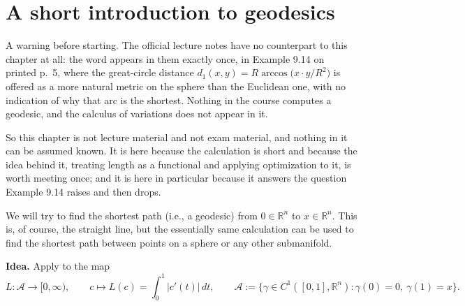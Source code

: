 

\section{A short introduction to geodesics}
\label{sec:geodesics}

\begin{ainote}
\label{ainote:geodesics_beyond_the_course}
A warning before starting. The official lecture notes have no counterpart to this chapter at
all: the word  appears in them exactly once, in
Example 9.14 on printed p.\ 5, where the great-circle distance
$d_1(x,y) = R\arccos\big(x\cdot y/R^2\big)$ is offered as a more natural metric on the sphere
than the Euclidean one, with no indication of why that arc is the shortest. Nothing in the
course computes a geodesic, and the calculus of variations does not appear in it.

So this chapter is not lecture material and not exam material, and nothing in it can be assumed
known. It is here
because the calculation is short and because the idea behind it, treating length as a functional
and applying optimization to it, is worth meeting once; and it is here in particular because it
answers the question Example 9.14 raises and then drops.
\end{ainote}

We will try to find the shortest path (i.e., a geodesic) from $0 \in \mathbb{R}^n$ to $x \in \mathbb{R}^n$. This
is, of course, the straight line, but the essentially same calculation can be used to find the
shortest path between points on a sphere or any other submanifold.

\textbf{Idea.} Apply  to the map
\[L : \mathcal A \to [0,\infty), \qquad c \mapsto L(c) = \int_0^1 \lvert c'(t)\rvert\,dt,
  \qquad \mathcal A := \{\gamma \in C^1([0,1],\mathbb{R}^n) : \gamma(0)=0,\ \gamma(1)=x\}.\]

